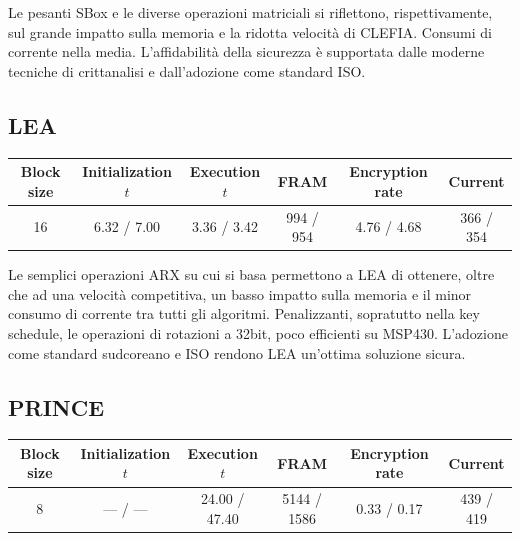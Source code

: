 \documentclass[target=bach,aauheader=,style=]{thud}
\begin{document}
		Le pesanti SBox e le diverse operazioni matriciali si riflettono, rispettivamente, sul grande impatto sulla memoria e la ridotta velocità di CLEFIA. Consumi di corrente nella media. L'affidabilità della sicurezza è supportata dalle moderne tecniche di crittanalisi e dall'adozione come standard ISO\cite{isoblock}.
		\subsection{LEA}
		\begin{center}
			\begin{tabular}{|c| *{5}{c|}}
				\hline
				\textbf{Block size} & \textbf{Initialization} $t$& \textbf{Execution} $t$ & \textbf{FRAM} & \textbf{Encryption rate} & \textbf{Current} \\
				\hline
				16 & \textcolor{Mahogany}{6.32} / \textcolor{OliveGreen}{7.00} & \textcolor{Mahogany}{3.36} / \textcolor{OliveGreen}{3.42} & \textcolor{Mahogany}{994} / \textcolor{OliveGreen}{954} & \textcolor{Mahogany}{4.76} / \textcolor{OliveGreen}{4.68} & \textcolor{Mahogany}{366} / \textcolor{OliveGreen}{354} \\
				\hline
			\end{tabular}
		\end{center}
		
		Le semplici operazioni ARX su cui si basa permettono a LEA di ottenere, oltre che ad una velocità competitiva, un basso impatto sulla memoria e il minor consumo di corrente tra tutti gli algoritmi. Penalizzanti, sopratutto nella key schedule, le operazioni di rotazioni a 32bit, poco efficienti su MSP430. L'adozione come standard sudcoreano e ISO\cite{isoblock} rendono LEA un'ottima soluzione sicura.
		\subsection{PRINCE}
		\begin{center}
			\begin{tabular}{|c| *{5}{c|}}
				\hline
				\textbf{Block size} & \textbf{Initialization} $t$& \textbf{Execution} $t$ & \textbf{FRAM} & \textbf{Encryption rate} & \textbf{Current} \\
				\hline
				8 & \textcolor{Mahogany}{---} / \textcolor{OliveGreen}{---} & \textcolor{Mahogany}{24.00} / \textcolor{OliveGreen}{47.40} & \textcolor{Mahogany}{5144} / \textcolor{OliveGreen}{1586} & \textcolor{Mahogany}{0.33} / \textcolor{OliveGreen}{0.17} & \textcolor{Mahogany}{439} / \textcolor{OliveGreen}{419} \\
				\hline
			\end{tabular}
		\end{center}
		
\end{document}
